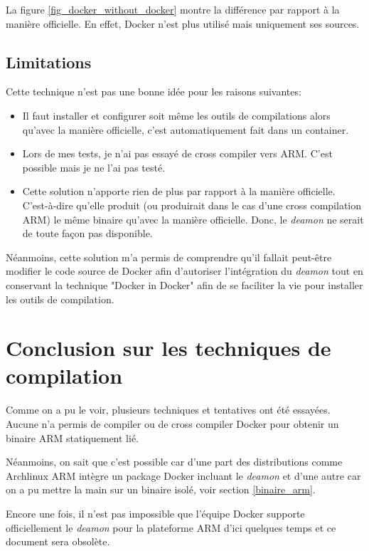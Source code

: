 \documentclass[11pt,a4paper,oneside]{report}
\begin{document}
La figure \ref{fig_docker_without_docker} montre la différence par rapport à la manière officielle. En effet, Docker n'est plus utilisé mais uniquement ses sources.

\subsection{Limitations}

Cette technique n'est pas une bonne idée pour les raisons suivantes:

\begin{itemize}
\item Il faut installer et configurer soit même les outils de compilations alors qu'avec la manière officielle, c'est automatiquement fait dans un container.
\item Lors de mes tests, je n'ai pas essayé de cross compiler vers ARM. C'est possible mais je ne l'ai pas testé.
\item Cette solution n'apporte rien de plus par rapport à la manière officielle. C'est-à-dire qu'elle produit (ou produirait dans le cas d'une cross compilation ARM) le même binaire qu'avec la manière officielle. Donc, le \textit{deamon} ne serait de toute façon pas disponible.

\end{itemize}

Néanmoins, cette solution m'a permis de comprendre qu'il fallait peut-être modifier le code source de Docker afin d'autoriser l'intégration du \textit{deamon} tout en conservant la technique "Docker in Docker" afin de se faciliter la vie pour installer les outils de compilation.

\section{Conclusion sur les techniques de compilation}

Comme on a pu le voir, plusieurs techniques et tentatives ont été essayées. Aucune n'a permis de  compiler ou de cross compiler Docker pour obtenir un binaire ARM statiquement lié.

Néanmoins, on sait que c'est possible car d'une part des distributions comme Archlinux ARM intègre un package Docker incluant le \textit{deamon} et d'une autre car on a pu mettre la main sur un binaire isolé, voir section \ref{binaire_arm}.

Encore une fois, il n'est pas impossible que l'équipe Docker supporte officiellement le \textit{deamon} pour la plateforme ARM d'ici quelques temps et ce document sera obsolète.
\end{document}
